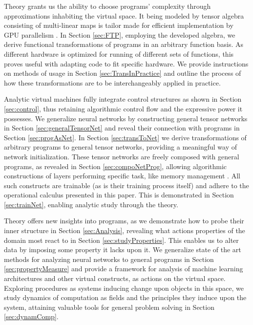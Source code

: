 \documentclass[preprint,12pt]{elsarticle}
\begin{document}
Theory grants us the ability to choose programs' complexity through approximations inhabiting the virtual space. It being modeled by tensor algebra consisting of multi-linear maps is tailor made for efficient implementation by GPU parallelism \cite{TensorGPU}. In Section \ref{sec:FTP}, employing the developed algebra, we derive functional transformations of programs in an arbitrary function basis. 
As different hardware is optimized for running of different sets of functions, this proves useful with adapting code to fit specific hardware.
We provide instructions on methods of usage in Section \ref{sec:TransInPractice} and outline the process of how these transformations are to be interchangeably applied in practice. 

Analytic virtual machines fully integrate control structures as shown in Section \ref{sec:control}, thus retaining algorithmic control flow and the expressive power it possesses. 
We generalize neural networks by constructing general tensor networks in Section \ref{sec:generalTensorNet} and reveal their connection with programs in Section \ref{sec:progAsNet}. In Section \ref{sec:transToNet} we derive transformations of arbitrary programs to general tensor networks, providing a meaningful way of network initialization. These tensor networks are freely composed with general programs, as revealed in Section \ref{sec:compoNetProg}, allowing algorithmic constructions of layers performing specific task, like memory management \cite{LSTM}\cite{netRam}. All such constructs are trainable (as is their training process itself) and adhere to the operational calculus presented in this paper. This is demonstrated in Section \ref{sec:trainNet}, enabling analytic study through the theory.

Theory offers new insights into programs, as we demonstrate how to probe their inner structure in Section \ref{sec:Analysis}, revealing what actions properties of the domain most react to in Section \ref{sec:studyProperties}. This enables us to alter data by imposing some property it lacks upon it.
We generalize state of the art methods for analyzing neural networks \cite{DeepDream} to general programs in Section \ref{sec:propertyMeasure} and provide a framework for analysis of machine learning architectures and other virtual constructs, as actions on the virtual space. Exploring procedures as systems inducing change upon objects in this space, we study dynamics of computation as fields and the principles they induce upon the system, attaining valuable tools for general problem solving in Section \ref{sec:dynamComp}.
\end{document}
